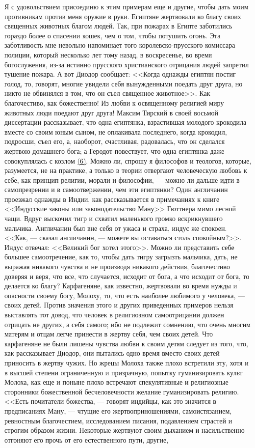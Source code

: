 \documentclass[12pt]{article}
\begin{document}
Я с удовольствием присоединю к этим примерам еще и другие, чтобы дать моим противникам против меня оружие в руки. Египтяне жертвовали ко благу своих священных животных благом людей. Так, при пожарах в Египте заботились гораздо более о спасении кошек, чем о том, чтобы потушить огонь. Эта заботливость мне невольно напоминает того королевско-прусского комиссара полиции, который несколько лет тому назад, в воскресенье, во время богослужения, из-за истинно прусского христианского отрицания людей запретил тушение пожара. А вот Диодор сообщает: <<Когда однажды египтян постиг голод, то, говорят, многие увидели себя вынужденными поедать друг друга, но никто не обвинялся в том, что он съел священное животное>>. Как благочестиво, как божественно! Из любви к освященному религией миру животных люди поедают друг друга! Максим Тирский в своей восьмой диссертации рассказывает, что одна египтянка, взрастившая молодого крокодила вместе со своим юным сыном, не оплакивала последнего, когда крокодил, подросши, съел его, а, наоборот, счастливая, радовалась, что он сделался жертвою домашнего бога; а Геродот повествует, что одна египтянка даже совокуплялась с козлом \hyperlink{6}{(6)}\hypertarget{b6}{}. Можно ли, спрошу я философов и теологов, которые, разумеется, не на практике, а только в теории отвергают человеческую любовь к себе, как принцип религии, морали и философии, --- можно ли дальше идти в самопрезрении и в самоотвержении, чем эти египтянки? Один англичанин проезжал однажды в Индии, как рассказывается в примечаниях к книге <<Индусские законы или законодательство Ману>> Гюттнера мимо лесной чащи. Вдруг выскочил тигр и схватил маленького громко вскрикнувшего мальчика. Англичанин был вне себя от ужаса и страха, индус же спокоен. <<Как, --- сказал англичанин, --- можете вы оставаться столь спокойным?>>. Индус отвечал: <<Великий бог хотел этого>>. Можно ли представить себе большее самоотречение, как то, чтобы дать тигру загрызть мальчика, дать, не выражая никакого чувства и не производя никакого действия, благочестиво доверяя и веря, что все, что случается, исходит от бога, а что исходит от бога, то делается ко благу? Карфагеняне, как известно, жертвовали во время нужды и опасности своему богу, Молоху, то, что есть наиболее любимого у человека, --- своих детей. Против значения этого и других приведенных примеров нельзя выставлять тот довод, что человек в религиозном самоотрицании должен отрицать не других, а себя самого; ибо не подлежит сомнению, что очень многим матерям и отцам легче принести в жертву себя, чем своих детей. Что карфагеняне не были лишены чувства любви к своим детям следует из того, что, как рассказывает Диодор, они пытались одно время вместо своих детей приносить в жертву чужих. Но жрецы Молоха также плохо встретили эту, хотя и в высшей степени ограниченную и призрачную, попытку гуманизировать культ Молоха, как еще и поныне плохо встречают спекулятивные и религиозные сторонники божественной бесчеловечности желание гуманизировать религию. <<Есть почитатели божества, --- говорят индийцы, как это значится в предписаниях Ману, --- чтущие его жертвоприношениями, самоистязанием, ревностным благочестием, исследованием писания, подавлением страстей и строгим образом жизни. Некоторые жертвуют своим дыханием и насильственно отгоняют его прочь от его естественного пути, другие, 
\end{document}
